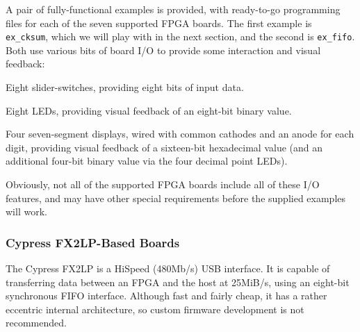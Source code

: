 A pair of fully-functional examples is provided, with ready-to-go programming files for each of the seven supported FPGA boards. The first example is \texttt{ex\_cksum}, which we will play with in the next section, and the second is \texttt{ex\_fifo}. Both use various bits of board I/O to provide some interaction and visual feedback:

\begin{blobs}
  \item
    Eight slider-switches, providing eight bits of input data.
  \item
    Eight LEDs, providing visual feedback of an eight-bit binary value.
  \item
    Four seven-segment displays, wired with common cathodes and an anode for each digit, providing visual feedback of a sixteen-bit hexadecimal value (and an additional four-bit binary value via the four decimal point LEDs).
\end{blobs}

Obviously, not all of the supported FPGA boards include all of these I/O features, and may have other special requirements before the supplied examples will work.

\subsubsection{Cypress FX2LP-Based Boards}

The Cypress FX2LP is a HiSpeed (480Mb/s) USB interface. It is capable of transferring data between an FPGA and the host at 25MiB/s, using an eight-bit synchronous FIFO interface. Although fast and fairly cheap, it has a rather eccentric internal architecture, so custom firmware development is not recommended.


